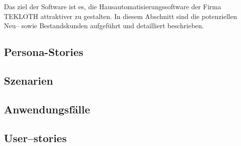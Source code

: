 Das ziel der Software ist es, die Hausautomatisierungssoftware der Firma TEKLOTH attraktiver zu gestalten.
In diesem Abschnitt sind die potenziellen Neu-- sowie Bestandskunden aufgeführt und detailliert beschrieben.

\subsection{Persona-Stories}\label{subsec:persona-stories}
    


\subsection{Szenarien}\label{subsec:szenarien}
    


\subsection{Anwendungsfälle}\label{subsec:anwendungsfaelle}
    


\subsection{User--stories}\label{subsec:user-stories}
    